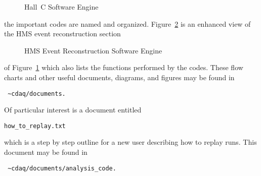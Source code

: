 \begin{figure}
\caption{Hall~C Software Engine}
\label{fig:7.8}
\end{figure}

the important codes are named and organized.
Figure~\ref{fig:7.9} is an enhanced view of the HMS event reconstruction section

\begin{figure}
\caption{HMS Event Reconstruction Software Engine\label{fig:7.9} }
\end{figure}

of Figure~\ref{fig:7.8} which also lists the functions performed by the codes.
These flow charts and other useful documents, diagrams, and
figures may be found in
\begin{verbatim} ~cdaq/documents. \end{verbatim}

Of particular interest is a document entitled \begin{verbatim}
how_to_replay.txt \end{verbatim}
which
is a step by step outline for a new user describing how to replay runs.
This document may be found in
\begin{verbatim} ~cdaq/documents/analysis_code. \end{verbatim}



